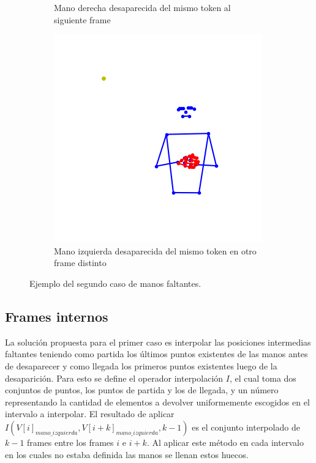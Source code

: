 \begin{figure}[t]
\begin{subfigure}[t]{0.3\textwidth}
		\caption{Mano derecha desaparecida del mismo token al siguiente frame }
		\label{f:mano_derecha_desaparecida}
	\end{subfigure}
		\begin{subfigure}[t]{0.3\textwidth}
	\centering
		\includegraphics[align=t,width=0.9\linewidth, height =0.9\linewidth]{Graphics/mano_faltante_interna.png}
		\caption{Mano izquierda desaparecida del mismo token en otro frame distinto}
		\label{f:mano_izquierda_desaparecida}
	\end{subfigure}
	\caption{Ejemplo del segundo caso de  manos faltantes.}
	\label{f:manos_faltantes}
\end{figure}

\subsection{Frames internos}
La solución propuesta para el primer caso es interpolar las posiciones intermedias faltantes teniendo como 
partida los últimos puntos existentes de las manos antes de desaparecer y como llegada los primeros puntos existentes 
luego de la desaparición. Para esto se define el operador interpolación $I$, el cual toma dos conjuntos de puntos, los 
puntos de partida y los de llegada, y un número representando la cantidad de elementos a devolver uniformemente
escogidos en el intervalo a interpolar. El resultado de aplicar 
$I(V[i]_{mano\_izquierda}, V[i + k]_{mano\_izquierda}, k - 1)$ es el conjunto interpolado de $k-1$ frames 
entre los frames $i$ e $i+k$. Al aplicar este método en cada intervalo en los cuales no estaba definida las manos 
se llenan estos huecos.
